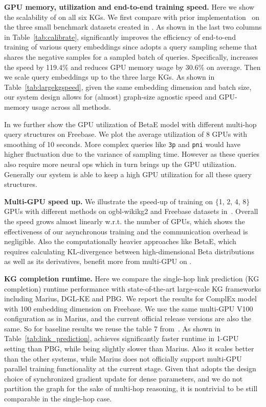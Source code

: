 \textbf{GPU memory, utilization and end-to-end training speed.}
Here we show the scalability of \modelshort on all six KGs. We first compare \modelshort with prior implementation~\cite{kgreasoning} on the three small benchmark datasets created in \citet{ren2020beta}. As shown in the last two columns in Table~\ref{tab:calibrate}, \modelshort significantly improves the efficiency of end-to-end training of various query embeddings since \modelshort adopts a query sampling scheme that shares the negative samples for a sampled batch of queries. Specifically, \modelshort increases the speed by 119.4\% and reduces GPU memory usage by 30.6\% on average. Then we scale query embeddings up to the three large KGs. As shown in Table~\ref{tab:largekgspeed},  given the same embedding dimension and batch size, our system design allows for (almost) graph-size agnostic speed and GPU-memory usage across all methods.




In  we further show the GPU utilization of BetaE model with different multi-hop query structures on Freebase. We plot the average utilization of 8 GPUs with smoothing of 10 seconds. More complex queries like \texttt{3p} and \texttt{pni} would have higher fluctuation due to the variance of sampling time. However as these queries also require more neural ops which in turn brings up the GPU utilization. Generally our system is able to keep a high GPU utilization for all these query structures.

\textbf{Multi-GPU speed up.}
We illustrate the speed-up of training on $\{$1, 2, 4, 8$\}$ GPUs with different methods on ogbl-wikikg2 and Freebase datasets in~. Overall the speed grows almost linearly w.r.t. the number of GPUs, which shows the effectiveness of our asynchronous training and the communication overhead is negligible. Also the computationally heavier approaches like BetaE, which requires calculating KL-divergence between high-dimensional Beta distributions as well as its derivatives, benefit more from multi-GPU on \modelshort. 

\textbf{KG completion runtime.}
Here we compare the single-hop link prediction (KG completion) runtime performance with state-of-the-art large-scale KG frameworks including Marius, DGL-KE and PBG. We report the results for ComplEx model with 100 embedding dimension on Freebase. We use the same multi-GPU V100 configuration as in Marius, and the current official release versions are also the same. So for baseline results we reuse the table 7 from~\citet{mohoney2021marius}. As shown in Table~\ref{tab:link_prediction}, \modelshort achieves significantly faster runtime in 1-GPU setting than PBG, while being slightly slower than Marius. Also it scales better than the other systems, while Marius does not officially support multi-GPU parallel training functionality at the current stage. Given that \modelshort adopts the design choice of synchronized gradient update for dense parameters, and we do not partition the graph for the sake of multi-hop reasoning, it is nontrivial to be still comparable in the single-hop case.



